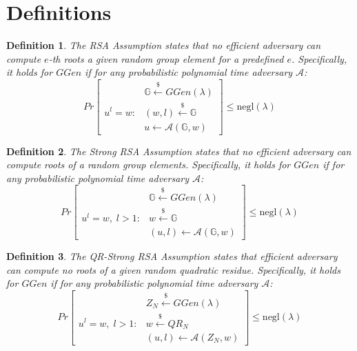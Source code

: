 \documentclass[a4paper]{article}
\newtheorem{definition}{Definition}
\begin{document}
\section{Definitions}

\begin{definition}
The \emph{RSA Assumption} states that no
efficient adversary can compute $e$-th roots a given random group element for a predefined $e$. Specifically,
it holds for $GGen$ if for any probabilistic polynomial time adversary $\mathcal{A}$:
$$
Pr
\begin{bmatrix}
&\mathbb{G}\xleftarrow{\$}GGen(\lambda)\\
u^l = w :
& (w,l)\xleftarrow{\$}\mathbb{G}\\
&u \xleftarrow{} \mathcal{A}(\mathbb{G},w)
\end{bmatrix}\leq \mathrm{negl}(\lambda)
$$
\end{definition}

\begin{definition}
The \emph{Strong RSA Assumption} states that no
efficient adversary can compute roots of a random group elements. Specifically,
it holds for $GGen$ if for any probabilistic polynomial time adversary $\mathcal{A}$:
$$
Pr
\begin{bmatrix}
&\mathbb{G}\xleftarrow{\$}GGen(\lambda)\\
u^l = w,\; l>1 :
& w\xleftarrow{\$}\mathbb{G}\\
&(u,l) \xleftarrow{} \mathcal{A}(\mathbb{G},w)
\end{bmatrix}\leq \mathrm{negl}(\lambda)
$$
\end{definition}

\begin{definition}
The \emph{QR-Strong RSA Assumption} states that 
efficient adversary can compute no roots of a given random quadratic residue. Specifically,
it holds for $GGen$ if for any probabilistic polynomial time adversary $\mathcal{A}$:
$$
Pr
\begin{bmatrix}
&Z_N\xleftarrow{\$}GGen(\lambda)\\
u^l = w,\; l>1 :
& w\xleftarrow{\$}QR_N\\
&(u,l) \xleftarrow{} \mathcal{A}(Z_N,w)
\end{bmatrix}\leq \mathrm{negl}(\lambda)
$$
\end{definition}
\end{document}
